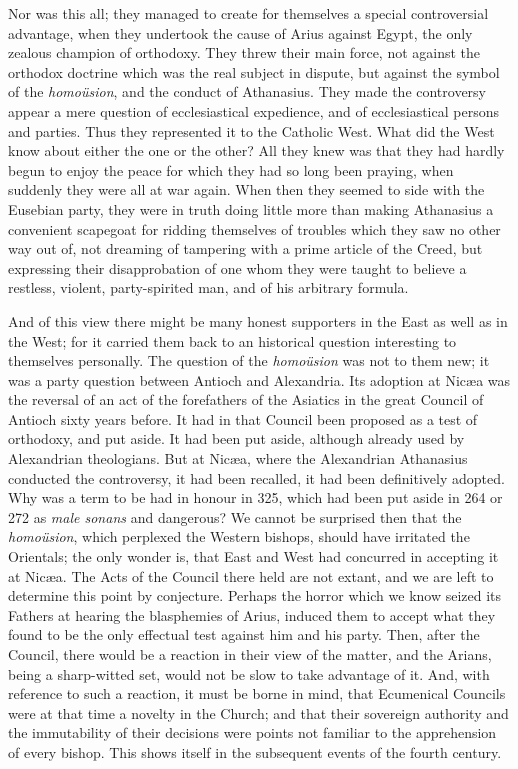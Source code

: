 Nor was this all; they managed to create for themselves a special
controversial advantage, when they undertook the cause of Arius
against Egypt, the only zealous champion of orthodoxy. They threw
their main force, not against the orthodox doctrine which was the real
subject in dispute, but against the symbol of the \emph{homoüsion},
and the conduct of Athanasius. They made the controversy appear a mere
question of ecclesiastical expedience, and of ecclesiastical persons
and parties. Thus they represented it to the Catholic West. What did
the West know about either the one or the other? All they knew
was that they had hardly begun to enjoy the peace for which they had
so long been praying, when suddenly they were all at war again. When
then they seemed to side with the Eusebian party, they were in truth
doing little more than making Athanasius a convenient scapegoat for
ridding themselves of troubles which they saw no other way out of, not
dreaming of tampering with a prime article of the Creed, but
expressing their disapprobation of one whom they were taught to
believe a restless, violent, party-spirited man, and of his arbitrary
formula.

And of this view there might be many honest supporters in the East
as well as in the West; for it carried them back to an historical
question interesting to themselves personally. The question of the \emph{homoüsion}
was not to them new; it was a party question between Antioch and
Alexandria. Its adoption at Nicæa was the reversal of an act of the
forefathers of the Asiatics in the great Council of Antioch sixty
years before. It had in that Council been proposed as a test of
orthodoxy, and put aside. It had been put aside, although already used
by Alexandrian theologians. But at Nicæa, where the Alexandrian
Athanasius conducted the controversy, it had been recalled, it had
been definitively adopted. Why was a term to be had in honour in 325,
which had been put aside in 264 or 272 as \emph{male sonans} and
dangerous? We cannot be surprised then that the \emph{homoüsion},
which perplexed the Western bishops, should have irritated the
Orientals; the only wonder is, that East and West had concurred in
accepting it at Nicæa. The Acts of the Council there held are not
extant, and we are left to determine this point by conjecture.
Perhaps the horror which we know seized its Fathers at hearing the
blasphemies of Arius, induced them to accept what they found to be the
only effectual test against him and his party. Then, after the
Council, there would be a reaction in their view of the matter, and
the Arians, being a sharp-witted set, would not be slow to take
advantage of it. And, with reference to such a reaction, it must be
borne in mind, that Ecumenical Councils were at that time a novelty in
the Church; and that their sovereign authority and the immutability of
their decisions were points not familiar to the apprehension of every
bishop. This shows itself in the subsequent events of the fourth
century.

